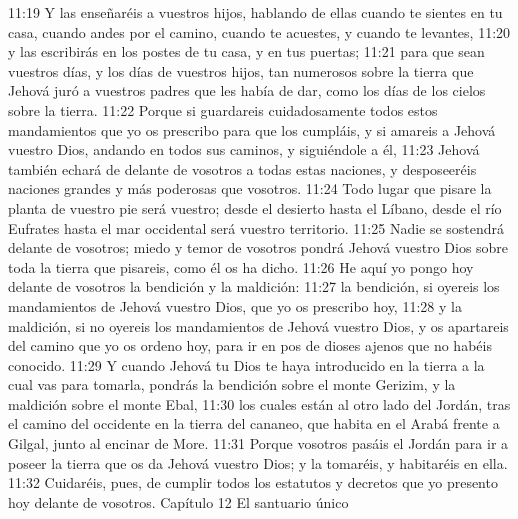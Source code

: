 11:19 Y las enseñaréis a vuestros hijos, hablando de ellas cuando te sientes en tu casa, cuando andes por el camino, cuando te acuestes, y cuando te levantes,  
11:20 y las escribirás en los postes de tu casa, y en tus puertas;  
11:21 para que sean vuestros días, y los días de vuestros hijos, tan numerosos sobre la tierra que Jehová juró a vuestros padres que les había de dar, como los días de los cielos sobre la tierra.  
11:22 Porque si guardareis cuidadosamente todos estos mandamientos que yo os prescribo para que los cumpláis, y si amareis a Jehová vuestro Dios, andando en todos sus caminos, y siguiéndole a él,  
11:23 Jehová también echará de delante de vosotros a todas estas naciones, y desposeeréis naciones grandes y más poderosas que vosotros.  
11:24 Todo lugar que pisare la planta de vuestro pie será vuestro; desde el desierto hasta el Líbano, desde el río Eufrates hasta el mar occidental será vuestro territorio.  
11:25 Nadie se sostendrá delante de vosotros; miedo y temor de vosotros pondrá Jehová vuestro Dios sobre toda la tierra que pisareis, como él os ha dicho.  
11:26 He aquí yo pongo hoy delante de vosotros la bendición y la maldición:  
11:27 la bendición, si oyereis los mandamientos de Jehová vuestro Dios, que yo os prescribo hoy,  
11:28 y la maldición, si no oyereis los mandamientos de Jehová vuestro Dios, y os apartareis del camino que yo os ordeno hoy, para ir en pos de dioses ajenos que no habéis conocido.  
11:29 Y cuando Jehová tu Dios te haya introducido en la tierra a la cual vas para tomarla, pondrás la bendición sobre el monte Gerizim, y la maldición sobre el monte Ebal,  
11:30 los cuales están al otro lado del Jordán, tras el camino del occidente en la tierra del cananeo, que habita en el Arabá frente a Gilgal, junto al encinar de More.  
11:31 Porque vosotros pasáis el Jordán para ir a poseer la tierra que os da Jehová vuestro Dios; y la tomaréis, y habitaréis en ella.  
11:32 Cuidaréis, pues, de cumplir todos los estatutos y decretos que yo presento hoy delante de vosotros.  
 Capítulo 12
El santuario único  

